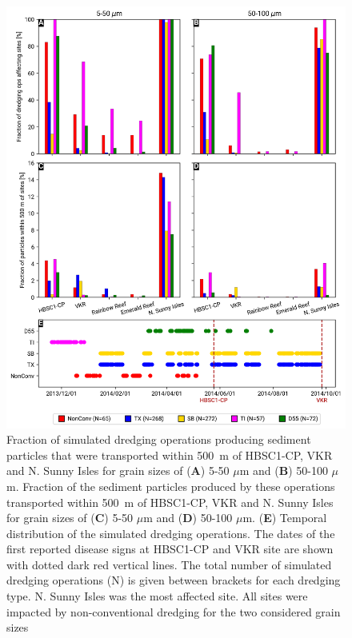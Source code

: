 \documentclass[preprint,12pt,authoryear]{elsarticle}
\begin{document}
\begin{figure}
	\centering
	\includegraphics[width=.85\textwidth]{figures/aggregated_stokes4_v3_500m_timeline_rel.png}
	\caption{Fraction of simulated dredging operations producing sediment particles that were transported within 500~m of HBSC1-CP, VKR and N. Sunny Isles for grain sizes of (\textbf{A}) 5-50 $\mu$m  and (\textbf{B}) 50-100 $\mu$m. Fraction of the sediment particles produced by these operations transported within 500~m of HBSC1-CP, VKR and N. Sunny Isles for grain sizes of (\textbf{C}) 5-50 $\mu$m  and (\textbf{D}) 50-100 $\mu$m. (\textbf{E}) Temporal distribution of the simulated dredging operations. The dates of the first reported disease signs at HBSC1-CP and VKR site are shown with dotted dark red vertical lines. The total number of simulated dredging operations (N) is given between brackets for each dredging type. N. Sunny Isles was the most affected site. All sites were impacted by non-conventional dredging for the two considered grain sizes}\label{fig:onset_bar}
\end{figure}
\end{document}
